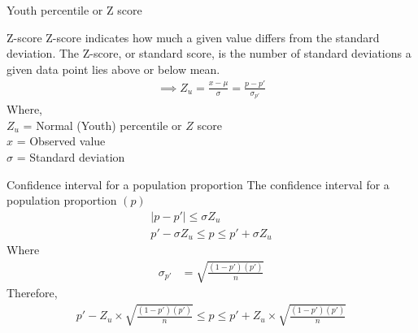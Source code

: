\documentclass{beamer}
\begin{document}
\begin{frame}{Youth percentile or Z score}
    \begin{block}{Z-score}
       Z-score indicates how much a given value differs from the
    standard deviation. The Z-score, or standard score, is the number of standard deviations a given data point lies above or below mean.
    \begin{align}
        \implies Z_u = \frac{x-\mu}{\sigma} = \frac{p-p'}{\sigma_{p'}}
    \end{align}
     Where,\\
        $Z_u$ = Normal (Youth) percentile or $Z$ score\\
        $ x $ = Observed value\\
        $\sigma $ = Standard deviation
        
    \end{block}
\end{frame}
\begin{frame}{}
     \begin{block}{Confidence interval for a population proportion}
        The confidence interval for a population proportion $(p)$
        \begin{align}
        | p-p' | \leq \sigma Z_u\\
        p'-\sigma Z_u \leq p \leq p'+\sigma Z_u
        \end{align}
        Where
        \begin{align}
            \sigma_{p'} &= \sqrt{\frac{(1-p')(p')}{n}}
        \end{align}
    Therefore,
        \begin{align}
           p' - Z_u \times \sqrt{\frac{(1-p')(p')}{n}} \leq p \leq p' + Z_u \times \sqrt{\frac{(1-p')(p')}{n}}\label{4}
        \end{align}
    \end{block}
\end{frame}
\end{document}
